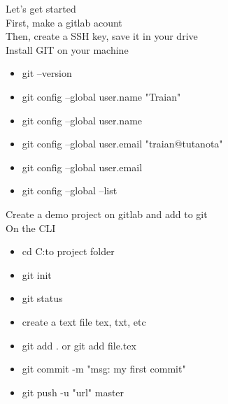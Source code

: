 \documentclass{article}
\begin{document}
    Let's get started\\
    First, make a gitlab acount\\
    Then, create a SSH key, save it in your drive\\
    Install GIT on your machine\\

\begin{itemize}

    \item [] git --version
    \item [] git config --global user.name "Traian"
    \item [] git config --global user.name
    \item [] git config --global user.email "traian@tutanota"
    \item [] git config --global user.email
    \item [] git config --global --list

\end{itemize}

    Create a demo project on gitlab and add to git\\
    On the CLI

\begin{itemize}

    \item [] cd C:to project folder
    \item [] git init
    \item [] git status
    \item [] create a text file tex, txt, etc
    \item [] git add . or git add file.tex
    \item [] git commit -m "msg: my first commit"
    \item [] git push -u "url" master

\end{itemize}
\end{document}
